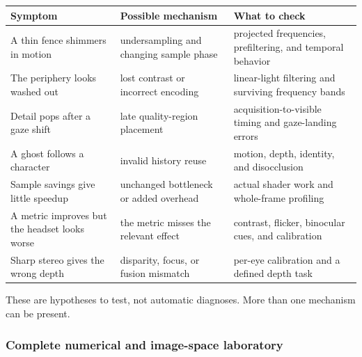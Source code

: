 \hypertarget{04-visual-computing-ii-ch043-diagnose-a-symptom-by-the-quantity-that-failed}{}

{\def\LTcaptype{none} %
\begin{longtable}[]{@{}
  >{\raggedright\arraybackslash}p{}
  >{\raggedright\arraybackslash}p{}
  >{\raggedright\arraybackslash}p{}@{}}
\toprule\noalign{}
\begin{minipage}[b]{\linewidth}\raggedright
Symptom
\end{minipage} & \begin{minipage}[b]{\linewidth}\raggedright
Possible mechanism
\end{minipage} & \begin{minipage}[b]{\linewidth}\raggedright
What to check
\end{minipage} \\
\midrule\noalign{}
\endhead
\bottomrule\noalign{}
\endlastfoot
A thin fence shimmers in motion & undersampling and changing sample phase & projected frequencies, prefiltering, and temporal behavior \\
The periphery looks washed out & lost contrast or incorrect encoding & linear-light filtering and surviving frequency bands \\
Detail pops after a gaze shift & late quality-region placement & acquisition-to-visible timing and gaze-landing errors \\
A ghost follows a character & invalid history reuse & motion, depth, identity, and disocclusion \\
Sample savings give little speedup & unchanged bottleneck or added overhead & actual shader work and whole-frame profiling \\
A metric improves but the headset looks worse & the metric misses the relevant effect & contrast, flicker, binocular cues, and calibration \\
Sharp stereo gives the wrong depth & disparity, focus, or fusion mismatch & per-eye calibration and a defined depth task \\
\end{longtable}
}

These are hypotheses to test, not automatic diagnoses. More than one mechanism can be present.

\subsubsection{Complete numerical and image-space laboratory}\label{04-visual-computing-ii-ch043-complete-numerical-and-image-space-laboratory}

